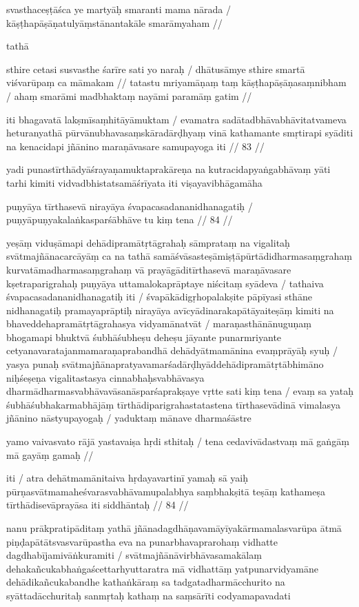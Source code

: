 svasthaceṣṭāśca ye martyāḥ smaranti mama nārada  /
kāṣṭhapāṣāṇatulyāṃstānantakāle smarāmyaham  //

tathā

sthire cetasi susvasthe śarīre sati yo naraḥ  /
dhātusāmye sthire smartā viśvarūpaṃ ca māmakam  //
tatastu mriyamāṇaṃ taṃ kāṣṭhapāṣāṇasaṃnibham  /
ahaṃ smarāmi madbhaktaṃ nayāmi paramāṃ gatim  //

iti bhagavatā lakṣmīsaṃhitāyāmuktam  / evamatra sadātadbhāvabhāvitatvameva heturanyathā pūrvānubhavasaṃskāradārḍhyaṃ vinā kathamante smṛtirapi syāditi na kenacidapi jñānino maraṇāvasare samupayoga iti  // 83  //

yadi punastīrthādyāśrayaṇamuktaprakāreṇa na kutracidapyaṅgabhāvaṃ yāti tarhi kimiti vidvadbhistatsamāśrīyata iti viṣayavibhāgamāha

puṇyāya tīrthasevā nirayāya śvapacasadananidhanagatiḥ  /
puṇyāpuṇyakalaṅkasparśābhāve tu kiṃ tena  // 84  //

yeṣāṃ viduṣāmapi dehādipramātṛtāgrahaḥ sāmprataṃ na vigalitaḥ svātmajñānacarcāyāṃ ca na tathā samāśvāsasteṣāmiṣṭāpūrtādidharmasaṃgrahaṃ kurvatāmadharmasaṃgrahaṃ vā prayāgāditīrthasevā maraṇāvasare kṣetraparigrahaḥ puṇyāya uttamalokaprāptaye niścitaṃ syādeva  / tathaiva śvapacasadananidhanagatiḥ iti  / śvapākādigṛhopalakṣite pāpīyasi sthāne nidhanagatiḥ pramayaprāptiḥ nirayāya avīcyādinarakapātāyaiteṣāṃ kimiti na bhaveddehapramātṛtāgrahasya vidyamānatvāt  / maraṇasthānānuguṇaṃ bhogamapi bhuktvā śubhāśubheṣu deheṣu jāyante punarmriyante cetyanavaratajanmamaraṇaprabandhā dehādyātmamānina evaṃprāyāḥ syuḥ  / yasya punaḥ svātmajñānapratyavamarśadārḍhyāddehādipramātṛtābhimāno niḥśeṣeṇa vigalitastasya cinnabhaḥsvabhāvasya dharmādharmasvabhāvavāsanāsparśaprakṣaye vṛtte sati kiṃ tena  / evaṃ sa yataḥ śubhāśubhakarmabhājāṃ tīrthādiparigrahastatastena tīrthasevādinā vimalasya jñānino nāstyupayogaḥ  / yaduktaṃ mānave dharmaśāstre

yamo vaivasvato rājā yastavaiṣa hṛdi sthitaḥ  /
tena cedavivādastvaṃ mā gaṅgāṃ mā gayāṃ gamaḥ  //

iti  / atra dehātmamānitaiva hṛdayavartinī yamaḥ sā yaiḥ pūrṇasvātmamaheśvarasvabhāvamupalabhya saṃbhakṣitā teṣāṃ kathameṣa tīrthādisevāprayāsa iti siddhāntaḥ  // 84  //

nanu prākpratipāditaṃ yathā jñānadagdhāṇavamāyīyakārmamalasvarūpa ātmā piṇḍapātātsvasvarūpastha eva na punarbhavaprarohaṃ vidhatte dagdhabījamivāṅkuramiti  / svātmajñānāvirbhāvasamakālaṃ dehakañcukabhaṅgaścettarhyuttaratra mā vidhattāṃ yatpunarvidyamāne dehādikañcukabandhe kathaṅkāraṃ sa tadgatadharmācchurito na syāttadācchuritaḥ sanmṛtaḥ kathaṃ na saṃsārīti codyamapavadati

